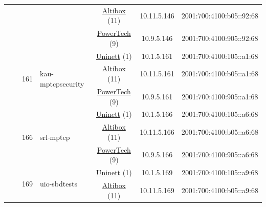\begin{small}
\begin{center}
\begin{longtable}{|c|c|c|c|c|c|c|c|}
  &  &  &  & \multicolumn{2}{|c|}{\tiny{\href{https://www.altibox.no}{Altibox} (11)}} & \tiny{10.11.5.146} & \tiny{2001:700:4100:b05::92:68} \\* \cline{5-5}\cline{6-6}\cline{7-7}\cline{8-8}
  &  &  &  & \multicolumn{2}{|c|}{\tiny{\href{http://www.powertech.no}{PowerTech} (9)}} & \tiny{10.9.5.146} & \tiny{2001:700:4100:905::92:68} \\* \cline{3-3}\cline{4-4}\cline{5-5}\cline{6-6}\cline{7-7}\cline{8-8}
  &  & \multirow{3}{*}{\tiny{161}} & \multicolumn{1}{|l|}{\multirow{3}{*}{\tiny{kau-mptcpsecurity}}} & \multicolumn{2}{|c|}{\tiny{\href{https://www.uninett.no}{Uninett} (1)}} & \tiny{10.1.5.161} & \tiny{2001:700:4100:105::a1:68} \\* \cline{5-5}\cline{6-6}\cline{7-7}\cline{8-8}
  &  &  &  & \multicolumn{2}{|c|}{\tiny{\href{https://www.altibox.no}{Altibox} (11)}} & \tiny{10.11.5.161} & \tiny{2001:700:4100:b05::a1:68} \\* \cline{5-5}\cline{6-6}\cline{7-7}\cline{8-8}
  &  &  &  & \multicolumn{2}{|c|}{\tiny{\href{http://www.powertech.no}{PowerTech} (9)}} & \tiny{10.9.5.161} & \tiny{2001:700:4100:905::a1:68} \\* \cline{3-3}\cline{4-4}\cline{5-5}\cline{6-6}\cline{7-7}\cline{8-8}
  &  & \multirow{3}{*}{\tiny{166}} & \multicolumn{1}{|l|}{\multirow{3}{*}{\tiny{srl-mptcp}}} & \multicolumn{2}{|c|}{\tiny{\href{https://www.uninett.no}{Uninett} (1)}} & \tiny{10.1.5.166} & \tiny{2001:700:4100:105::a6:68} \\* \cline{5-5}\cline{6-6}\cline{7-7}\cline{8-8}
  &  &  &  & \multicolumn{2}{|c|}{\tiny{\href{https://www.altibox.no}{Altibox} (11)}} & \tiny{10.11.5.166} & \tiny{2001:700:4100:b05::a6:68} \\* \cline{5-5}\cline{6-6}\cline{7-7}\cline{8-8}
  &  &  &  & \multicolumn{2}{|c|}{\tiny{\href{http://www.powertech.no}{PowerTech} (9)}} & \tiny{10.9.5.166} & \tiny{2001:700:4100:905::a6:68} \\* \cline{3-3}\cline{4-4}\cline{5-5}\cline{6-6}\cline{7-7}\cline{8-8}
  &  & \multirow{3}{*}{\tiny{169}} & \multicolumn{1}{|l|}{\multirow{3}{*}{\tiny{uio-sbdtests}}} & \multicolumn{2}{|c|}{\tiny{\href{https://www.uninett.no}{Uninett} (1)}} & \tiny{10.1.5.169} & \tiny{2001:700:4100:105::a9:68} \\* \cline{5-5}\cline{6-6}\cline{7-7}\cline{8-8}
  &  &  &  & \multicolumn{2}{|c|}{\tiny{\href{https://www.altibox.no}{Altibox} (11)}} & \tiny{10.11.5.169} & \tiny{2001:700:4100:b05::a9:68} \\* \cline{5-5}\cline{6-6}\cline{7-7}\cline{8-8}

\end{longtable}
\end{center}
\end{small}
